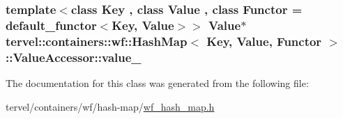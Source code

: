 \subsubsection[{value\+\_\+}]{\setlength{\rightskip}{0pt plus 5cm}template$<$class Key , class Value , class Functor  = default\+\_\+functor$<$\+Key, Value$>$$>$ {\bf Value}$\ast$ {\bf tervel\+::containers\+::wf\+::\+Hash\+Map}$<$ Key, {\bf Value}, Functor $>$\+::Value\+Accessor\+::value\+\_\+\hspace{0.3cm}{\ttfamily [private]}}\label{classtervel_1_1containers_1_1wf_1_1_hash_map_1_1_value_accessor_a75ab81c8fa2032a5a4a9dff43227c387}


The documentation for this class was generated from the following file\+:\begin{DoxyCompactItemize}
\item 
tervel/containers/wf/hash-\/map/\hyperlink{wf__hash__map_8h}{wf\+\_\+hash\+\_\+map.\+h}\end{DoxyCompactItemize}
